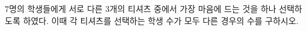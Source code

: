 \hspace*{2mm}\begin{minipage}[t]{\dimexpr\linewidth-2mm\relax}\vspace{0pt}
$7$명의 학생들에게 서로 다른 $3$개의 티셔츠 중에서 가장 마음에 드는 것을 하나 선택하도록 하였다. 이때 각 티셔츠를 선택하는 학생 수가 모두 다른 경우의 수를 구하시오. \end{minipage}
